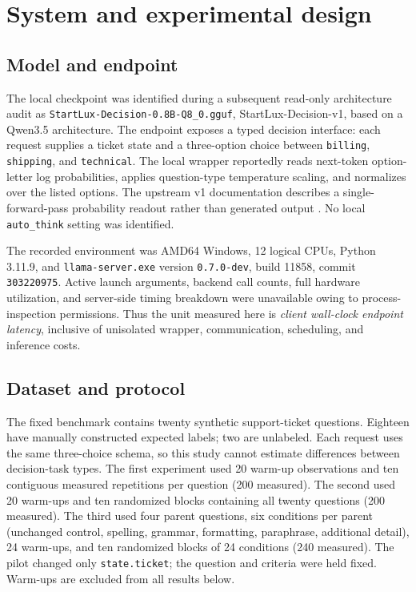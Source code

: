 \documentclass[10pt,twocolumn]{article}
\begin{document}
\section{System and experimental design}
\subsection{Model and endpoint}
The local checkpoint was identified during a subsequent read-only architecture audit as \texttt{StartLux-Decision-0.8B-Q8\_0.gguf}, StartLux-Decision-v1, based on a Qwen3.5 architecture. The endpoint exposes a typed decision interface: each request supplies a ticket state and a three-option choice between \texttt{billing}, \texttt{shipping}, and \texttt{technical}. The local wrapper reportedly reads next-token option-letter log probabilities, applies question-type temperature scaling, and normalizes over the listed options. The upstream v1 documentation describes a single-forward-pass probability readout rather than generated output \cite{startluxv1}. No local \texttt{auto\_think} setting was identified.

The recorded environment was AMD64 Windows, 12 logical CPUs, Python 3.11.9, and \texttt{llama-server.exe} version \texttt{0.7.0-dev}, build 11858, commit \texttt{303220975}. Active launch arguments, backend call counts, full hardware utilization, and server-side timing breakdown were unavailable owing to process-inspection permissions. Thus the unit measured here is \emph{client wall-clock endpoint latency}, inclusive of unisolated wrapper, communication, scheduling, and inference costs.

\subsection{Dataset and protocol}
The fixed benchmark contains twenty synthetic support-ticket questions. Eighteen have manually constructed expected labels; two are unlabeled. Each request uses the same three-choice schema, so this study cannot estimate differences between decision-task types. The first experiment used 20 warm-up observations and ten contiguous measured repetitions per question (200 measured). The second used 20 warm-ups and ten randomized blocks containing all twenty questions (200 measured). The third used four parent questions, six conditions per parent (unchanged control, spelling, grammar, formatting, paraphrase, additional detail), 24 warm-ups, and ten randomized blocks of 24 conditions (240 measured). The pilot changed only \texttt{state.ticket}; the question and criteria were held fixed. Warm-ups are excluded from all results below.
\end{document}
